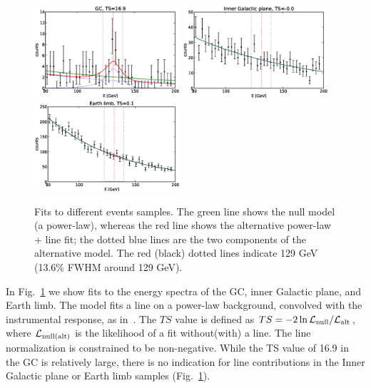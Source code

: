 \documentclass[aps,twocolumn,prd,superscriptaddress,showpacs,nofootinbib,fixfloat]{revtex4}
\begin{document}
\begin{figure}
  \centering
  \includegraphics[width=0.48\textwidth]{plots/counts_GC.eps}
  \includegraphics[width=0.48\textwidth]{plots/counts_IGP.eps}
  \includegraphics[width=0.48\textwidth]{plots/counts_limb.eps}
  \caption{Fits to different events samples. The green line
  shows the null model (a power-law), whereas the red line
  shows the alternative power-law + line fit; the dotted
  blue lines are the two components of the alternative
  model. The red (black) dotted lines indicate 129 GeV
  (13.6\% FWHM around 129 GeV).}
  \label{fig:spectra1}
\end{figure}

In Fig.~\ref{fig:spectra1} we show fits to the energy
spectra of the GC, inner Galactic plane, and Earth limb.  The model fits a
line on a power-law background, convolved with the instrumental response, as
in~\cite{Weniger:2012}. The $TS$ value
is defined as $TS=-2\ln \mathcal{L}_{\rm
null}/\mathcal{L}_{\rm alt}$, where $\mathcal{L}_{\rm
null(alt)}$ is the likelihood of a fit without(with) a line.  The line
normalization is constrained to be non-negative. While the TS value of 16.9 in
the GC is relatively large, there is no indication for line contributions in
the Inner Galactic plane or Earth limb samples (Fig.~\ref{fig:spectra1}).
\end{document}
